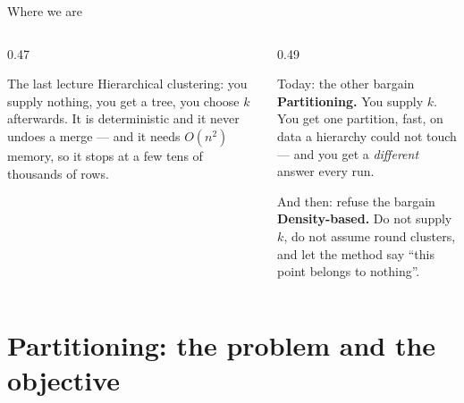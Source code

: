 \documentclass[aspectratio=169]{beamer}
\begin{document}
\begin{frame}[shrink=6]{Where we are}
  \begin{columns}[T]
    \begin{column}{0.47\textwidth}
      \begin{block}{The last lecture}
        Hierarchical clustering: you supply nothing, you get a tree, you
        choose $k$ afterwards. It is deterministic and it never undoes a
        merge --- and it needs $O(n^2)$ memory, so it stops at a few tens of
        thousands of rows.
      \end{block}
    \end{column}
    \begin{column}{0.49\textwidth}
      \begin{exampleblock}{Today: the other bargain}
        \textbf{Partitioning.} You supply $k$. You get one partition, fast,
        on data a hierarchy could not touch --- and you get a
        \emph{different} answer every run.
      \end{exampleblock}
      \begin{alertblock}{And then: refuse the bargain}
        \textbf{Density-based.} Do not supply $k$, do not assume round
        clusters, and let the method say ``this point belongs to nothing''.
      \end{alertblock}
    \end{column}
  \end{columns}
\end{frame}

\section[Partitioning]{Partitioning: the problem and the objective}
\label{sec:part}
\end{document}
